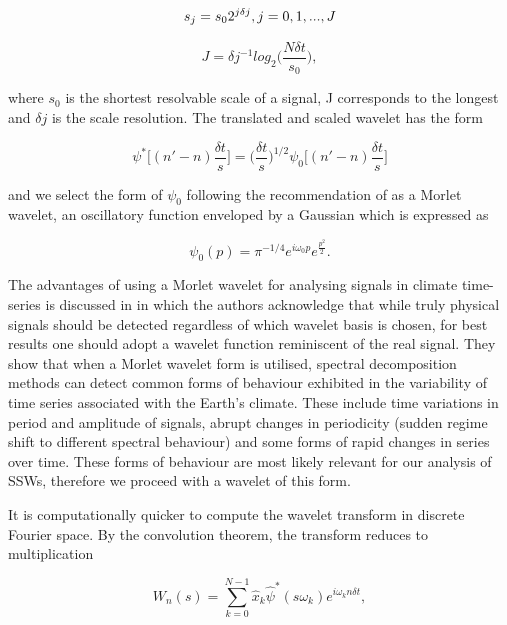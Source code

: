 \begin{equation} \label{S}
s_j = s_0 2^{j \delta j},\\ j = 0, 1, ..., J
\end{equation}

\begin{equation} \label{S}
J = \delta j^{-1} log_2\bigg(\frac{N \delta t}{s_0}\bigg),
\end{equation}

where $s_0$ is the shortest resolvable scale of a signal, J corresponds to the longest and $\delta j$ is the scale resolution. The translated and scaled wavelet has the form

\begin{equation} \label{wavelet}
\psi^* \bigg[(n' - n) \frac{\delta t}{s}\bigg] = \bigg(\frac{\delta t}{s}\bigg)^{1/2} \psi_0\bigg[(n' - n) \frac{\delta t}{s}\bigg]
\end{equation}

and we select the form of $\psi_0$ following the recommendation of \cite{Torrence1998} as a Morlet wavelet, an oscillatory function enveloped by a Gaussian which is expressed as

\begin{equation} \label{psi0}
\psi_0(p) = \pi^{-1/4} e^{i\omega_0 p} e^{\frac{p^2}{2}}.
\end{equation}

The advantages of using a Morlet wavelet for analysing signals in climate time-series is discussed in \cite{Lau1995} in which the authors acknowledge that while truly physical signals should be detected regardless of which wavelet basis is chosen, for best results one should adopt a wavelet function reminiscent of the real signal. They show that when a Morlet wavelet form is utilised, spectral decomposition methods can detect common forms of behaviour exhibited in the variability of time series associated with the Earth's climate. These include time variations in period and amplitude of signals, abrupt changes in periodicity (sudden regime shift to different spectral behaviour) and some forms of rapid changes in series over time. These forms of behaviour are most likely relevant for our analysis of SSWs, therefore we proceed with a wavelet of this form. 

It is computationally quicker to compute the wavelet transform in discrete Fourier space. By the convolution theorem, the transform reduces to multiplication

\begin{equation} \label{wavelet_transform2}
W_n(s) = \sum^{N - 1}_{k = 0} \hat{x}_{k} \hat{\psi}^* (s\omega_k) e^{i \omega_k n \delta t},
\end{equation}


